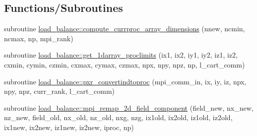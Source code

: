 \subsection*{Functions/\+Subroutines}
\begin{DoxyCompactItemize}
\item 
subroutine \hyperlink{namespaceload__balance_a01de34e5200e19001ef6a0819fc73ab9}{load\+\_\+balance\+::compute\+\_\+currproc\+\_\+array\+\_\+dimensions} (nnew, ncmin, ncmax, np, mpi\+\_\+rank)
\item 
subroutine \hyperlink{namespaceload__balance_a23f2ec36e02070edb8645281e4de7a11}{load\+\_\+balance\+::get\+\_\+1darray\+\_\+proclimits} (ix1, ix2, iy1, iy2, iz1, iz2, cxmin, cymin, czmin,                                                                                                                                           cxmax, cymax, czmax, npx, npy, npz, np, l\+\_\+cart\+\_\+comm)
\item 
subroutine \hyperlink{namespaceload__balance_a956f41bdb759ed748f8e75fd86a18d59}{load\+\_\+balance\+::pxr\+\_\+convertindtoproc} (mpi\+\_\+comm\+\_\+in, ix, iy, iz, npx, npy, npz, curr\+\_\+rank, l\+\_\+cart\+\_\+comm)
\item 
subroutine \hyperlink{namespaceload__balance_ae5489890ffdc28631b9c4f895a84396c}{load\+\_\+balance\+::mpi\+\_\+remap\+\_\+2d\+\_\+field\+\_\+component} (field\+\_\+new, nx\+\_\+new, nz\+\_\+new,                                                                                                                                                                                       field\+\_\+old, nx\+\_\+old, nz\+\_\+old,                                                                                                                                                                                       nxg, nzg,                                                                                                                                                                                                                                                       ix1old, ix2old, iz1old, iz2old,                                                                                                                                                           ix1new, ix2new, iz1new, iz2new,                                                                                                                                                           iproc, np)
\item 

\end{DoxyCompactItemize}
